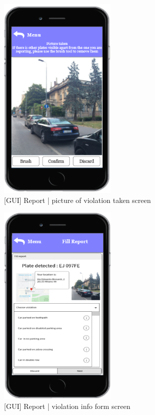 \begin{figure}[h]
		\centering
      \includegraphics[width=0.5\textwidth]{GUI/pictaken.png}
      \caption{[GUI] Report | picture of violation taken screen}   \label{fig:pictaken}
\end{figure}


\begin{figure}[h]
		\centering
      \includegraphics[width=0.5\textwidth]{GUI/FillReport.png}
      \caption{[GUI] Report | violation info form screen}   \label{fig:FillReport}
\end{figure}

